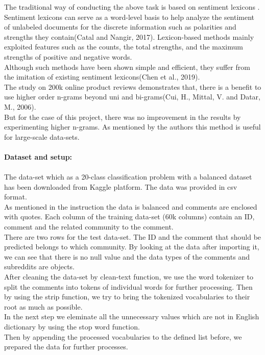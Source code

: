 \documentclass[12pt]{report}
\begin{document}
	The traditional way of conducting the above task is based on sentiment lexicons . Sentiment lexicons can serve as a word-level basis to help analyze the sentiment of unlabeled documents for the discrete information such as polarities and strengths they contain(Catal and Nangir, 2017). Lexicon-based methods mainly exploited features such as the counts, the total strengths, and the maximum strengths of positive and negative words.\\
	Although such methods have been shown simple and efficient, they suffer from the imitation of existing sentiment lexicons(Chen et al., 2019).\\
	
	The study on 200k online product reviews demonstrates that, there is a benefit to use higher order n-grams beyond uni and bi-grams(Cui, H., Mittal, V. and Datar, M., 2006).\\
	But for the case of this project, there was no improvement in the results by experimenting higher n-grams.
	As mentioned by the authors this method is useful for large-scale data-sets. \\
	
	
	
	\paragraph{Dataset and setup:}
	\paragraph{}
	The data-set which as a 20-class classification problem with a balanced
	dataset has been downloaded from Kaggle platform. The data was provided in csv format.\\
	As mentioned in the instruction the data is balanced and comments are enclosed with quotes.
	Each column of the training data-set (60k columns) contain an ID, comment and the related community to the comment.\\
	There are two rows for the test data-set. The ID and the comment that should be predicted belongs to which community.
	By looking at the data after importing it, we can see that there is no null value and the data types of the comments and subreddits are objects. \\
	After cleaning the data-set by clean-text function, we use the word tokenizer to split the comments into tokens of individual words for further processing. Then by using the strip function, we try to bring the tokenized vocabularies to their root as much as possible.\\
	In the next step we eleminate all the unnecessary values which are not in English dictionary by using the stop word function. \\
	Then by appending the processed vocabularies to the defined list before, we prepared the data for further processes. \\
	
\end{document}

